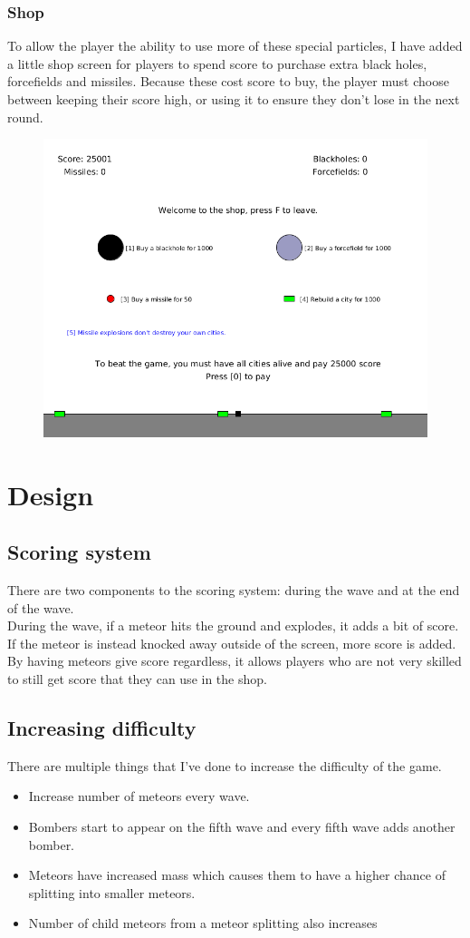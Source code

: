 \documentclass{article}
\newcommand{\n}[0]{\\[\baselineskip]}
\begin{document}
\subsubsection*{Shop}
To allow the player the ability to use more of these special particles, I have added a little shop screen for players to spend score to purchase extra black holes, forcefields and missiles. Because these cost score to buy, the player must choose between keeping their score high, or using it to ensure they don't lose in the next round. 
\begin{figure}[H]
\centering
\includegraphics[width=1\textwidth, keepaspectratio]{imgs/Shop.png}
\end{figure}


\section{Design}

\subsection{Scoring system}
There are two components to the scoring system: during the wave and at the end of the wave. \n
During the wave, if a meteor hits the ground and explodes, it adds a bit of score. If the meteor is instead knocked away outside of the screen, more score is added. By having meteors give score regardless, it allows players who are not very skilled to still get score that they can use in the shop. 
\subsection{Increasing difficulty}
There are multiple things that I've done to increase the difficulty of the game. 
\begin{itemize}
\item Increase number of meteors every wave.
\item Bombers start to appear on the fifth wave and every fifth wave adds another bomber.
\item Meteors have increased mass which causes them to have a higher chance of splitting into smaller meteors.
\item Number of child meteors from a meteor splitting also increases 
\end{itemize}
\end{document}
